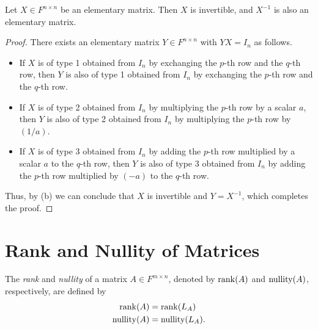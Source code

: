 \begin{proposition}
  Let $X \in F^{n \times n}$ be an elementary matrix.
  Then $X$ is invertible, and $X^{-1}$ is also an elementary matrix.
\end{proposition}
\begin{proof}
  There exists an elementary matrix $Y \in F^{n \times n}$ with $YX = I_n$ as
  follows.
  \begin{itemize}
    \item If $X$ is of type 1 obtained from $I_n$ by exchanging the $p$-th row
    and the $q$-th row, then $Y$ is also of type 1 obtained from $I_n$ by
    exchanging the $p$-th row and the $q$-th row.
    \item If $X$ is of type 2 obtained from $I_n$ by multiplying the $p$-th row
    by a scalar $a$, then $Y$ is also of type 2 obtained from $I_n$ by
    multiplying the $p$-th row by $(1/a)$.
    \item If $X$ is of type 3 obtained from $I_n$ by adding the $p$-th row
    multiplied by a scalar $a$ to the $q$-th row, then $Y$ is also of type 3
    obtained from $I_n$ by adding the $p$-th row multiplied by $(-a)$ to the
    $q$-th row.
  \end{itemize}
  Thus, by  (b) we can conclude that $X$ is
  invertible and $Y = X^{-1}$, which completes the proof.
\end{proof}

\section{Rank and Nullity of Matrices}
\begin{definition}
  The \emph{rank} and \emph{nullity} of a matrix $A \in F^{m \times n}$,
  denoted by $\operatorname{rank}(A)$ and $\operatorname{nullity}(A)$, respectively, are defined by
  \begin{align*}
    \operatorname{rank}(A) &= \operatorname{rank}(L_A) \\
    \operatorname{nullity}(A) &= \operatorname{nullity}(L_A).
  \end{align*}
\end{definition}

